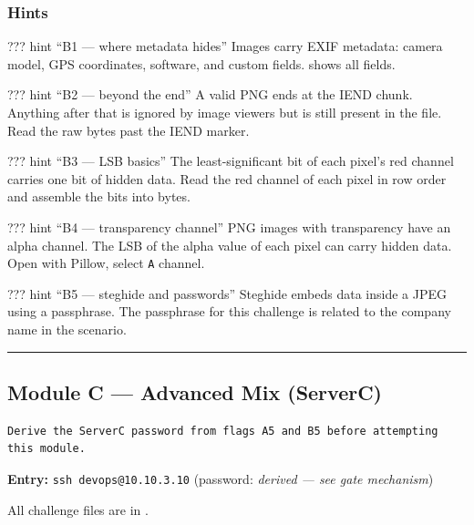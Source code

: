 \subsubsection{Hints}

??? hint ``B1 --- where metadata hides'' Images carry EXIF metadata: camera model, GPS coordinates, software, and custom fields.  shows all fields.

??? hint ``B2 --- beyond the end'' A valid PNG ends at the IEND chunk. Anything after that is ignored by image viewers but is still present in the file. Read the raw bytes past the IEND marker.

??? hint ``B3 --- LSB basics'' The least-significant bit of each pixel's red channel carries one bit of hidden data. Read the red channel of each pixel in row order and assemble the bits into bytes.

??? hint ``B4 --- transparency channel'' PNG images with transparency have an alpha channel. The LSB of the alpha value of each pixel can carry hidden data. Open with Pillow, select \texttt{\textquotesingle{}A\textquotesingle{}} channel.

??? hint ``B5 --- steghide and passwords'' Steghide embeds data inside a JPEG using a passphrase. The passphrase for this challenge is related to the company name in the scenario. 

\begin{center}\rule{0.5\linewidth}{0.5pt}\end{center}

\subsection{Module C --- Advanced Mix (ServerC)}

\begin{lstlisting}
Derive the ServerC password from flags A5 and B5 before attempting this module.
\end{lstlisting}

\textbf{Entry:} \texttt{ssh\ devops@10.10.3.10} (password: \emph{derived --- see gate mechanism})

All challenge files are in .

